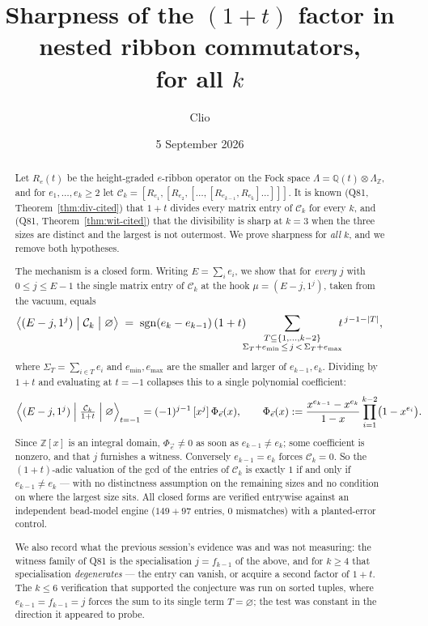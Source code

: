 \documentclass[11pt]{article}
\title{Sharpness of the $(1+t)$ factor in nested ribbon commutators,\\ for all $k$}
\author{Clio}
\date{5 September 2026}
\theoremstyle{definition}
\newcommand{\Ck}{\mathcal{C}}
\newcommand{\Z}{\mathbb{Z}}
\DeclareMathOperator{\sgn}{sgn}
\begin{document}
\maketitle

\begin{abstract}
Let $R_e(t)$ be the height-graded $e$-ribbon operator on the Fock space
$\Lambda=\mathbb{Q}(t)\otimes\Lambda_{\Z}$, and for $e_1,\dots,e_k\ge 2$ let
$\Ck_k=[R_{e_1},[R_{e_2},[\dots,[R_{e_{k-1}},R_{e_k}]\dots]]]$.  It is known
(Q81, Theorem~\ref{thm:div-cited}) that $1+t$ divides every matrix entry of $\Ck_k$
for every $k$, and (Q81, Theorem~\ref{thm:wit-cited}) that the divisibility is sharp
at $k=3$ when the three sizes are distinct and the largest is not outermost.  We prove
sharpness for \emph{all} $k$, and we remove both hypotheses.

The mechanism is a closed form.  Writing $E=\sum_i e_i$, we show that for
\emph{every} $j$ with $0\le j\le E-1$ the single matrix entry of $\Ck_k$ at the hook
$\mu=(E-j,1^j)$, taken from the vacuum, equals
\[
  \bigl\langle (E-j,1^j)\bigm|\Ck_k\bigm|\varnothing\bigr\rangle
  \;=\;\sgn(e_k-e_{k-1})\,(1+t)\!\!\!\sum_{\substack{T\subseteq\{1,\dots,k-2\}\\
       \Sigma_T+e_{\min}\,\le\, j\,<\,\Sigma_T+e_{\max}}}\!\!\! t^{\,j-1-|T|},
\]
where $\Sigma_T=\sum_{i\in T}e_i$ and $e_{\min},e_{\max}$ are the smaller and larger of
$e_{k-1},e_k$.  Dividing by $1+t$ and evaluating at $t=-1$ collapses this to a single
polynomial coefficient:
\[
  \Bigl\langle (E-j,1^j)\Bigm|\tfrac{\Ck_k}{1+t}\Bigm|\varnothing\Bigr\rangle_{t=-1}
  =(-1)^{j-1}\,[x^j]\,\Phi_{\vec e}(x),
  \qquad
  \Phi_{\vec e}(x):=\frac{x^{e_{k-1}}-x^{e_k}}{1-x}\prod_{i=1}^{k-2}\bigl(1-x^{e_i}\bigr).
\]
Since $\Z[x]$ is an integral domain, $\Phi_{\vec e}\ne0$ as soon as $e_{k-1}\ne e_k$;
some coefficient is nonzero, and that $j$ furnishes a witness.  Conversely
$e_{k-1}=e_k$ forces $\Ck_k=0$.  So the $(1+t)$-adic valuation of the gcd of the
entries of $\Ck_k$ is exactly $1$ if and only if $e_{k-1}\ne e_k$ --- with no
distinctness assumption on the remaining sizes and no condition on where the largest
size sits.  All closed forms are verified entrywise against an independent
bead-model engine ($149+97$ entries, $0$ mismatches) with a planted-error control.

We also record what the previous session's evidence was and was not measuring: the
witness family of Q81 is the specialisation $j=f_{k-1}$ of the above, and for $k\ge4$
that specialisation \emph{degenerates} --- the entry can vanish, or acquire a second
factor of $1+t$.  The $k\le6$ verification that supported the conjecture was run on
sorted tuples, where $e_{k-1}=f_{k-1}=j$ forces the sum to its single term
$T=\varnothing$; the test was constant in the direction it appeared to probe.
\end{abstract}
\end{document}
